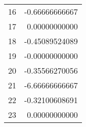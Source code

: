 \begin{table}[H]
\begin{tabular}{lr}
        
            16
             
               &
            
        
            -0.66666666667
            
        
        \\
    
        
            17
             
               &
            
        
            0.00000000000
            
        
        \\
    
        
            18
             
               &
            
        
            -0.45089524089
            
        
        \\
    
        
            19
             
               &
            
        
            -0.00000000000
            
        
        \\
    
        
            20
             
               &
            
        
            -0.35566270056
            
        
        \\
    
        
            21
             
               &
            
        
            -6.66666666667
            
        
        \\
    
        
            22
             
               &
            
        
            -0.32100608691
            
        
        \\
    
        
            23
             
               &
            
        
            0.00000000000
            

\end{tabular}
\end{table}
